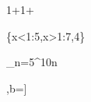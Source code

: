1+1+

\left\{x<1:5,x>1:7,4\right\}


\sum_{n=5}^{10}n

\sqrt{ }

\left[a+b\operatorname{for}a=\left[1...5\right],b=\left[2...6\right]\right]